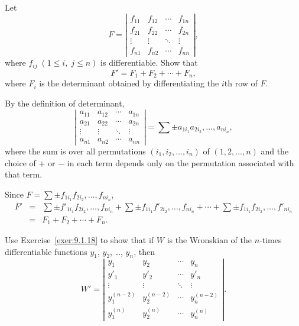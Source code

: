 \documentclass{ximera}
\begin{document}
\begin{problem}\label{exer:9.1.18}
Let
$$
F=\left|\begin{array}{cccc}
f_{11}&f_{12}&\cdots&f_{1n}\\ 
f_{21}&f_{22}&\cdots&f_{2n}\\ 
\vdots&\vdots&\ddots&\vdots\\ 
f_{n1}&f_{n2}&\cdots&f_{nn}\end{array}\right|,
$$
where $f_{ij}\; (1\le i,\;   j\le n)$ is differentiable.  Show that
$$
F'=F_1+F_2+\cdots+F_n,
$$
where $F_i$ is the determinant obtained by differentiating the
$i$th row of $F$.

\begin{hint}
By the definition of determinant,
$$
\left|\begin{array}{cccc}
a_{11}&a_{12}&\cdots&a_{1n}\\ 
a_{21}&a_{22}&\cdots&a_{2n}\\ 
\vdots&\vdots&\ddots&\vdots\\ 
a_{n1}&a_{n2}&\cdots&a_{nn}\end{array}\right|
=\sum\pm a_{1i_1}a_{2i_2},\dots,a_{ni_n},
$$
where the sum is over all permutations $(i_1,i_2,\dots,i_n)$ of
$(1,2,\dots, n)$ and the choice of $+$ or $-$ in each term depends
only on the permutation associated with that term.
\end{hint}

\begin{solution}
Since
$F=\sum\pm f_{1i_1}f_{2i_2},\dots,f_{ni_n}$,
\begin{eqnarray*}
F'&=&\sum\pm f'_{1i_1}f_{2i_2},\dots,f_{ni_n}
+\sum\pm f_{1i_1}f'_{2i_2},\dots,f_{ni_n}+\cdots+
\sum\pm f_{1i_1}f_{2i_2},\dots,f'_{ni_n}\\
&=&F_1+F_2+\cdots+F_n.
\end{eqnarray*}
\end{solution}
\end{problem}


\begin{problem}\label{exer:9.1.19}
Use Exercise~\ref{exer:9.1.18}  to show that if $W$ is the
Wronskian of the
$n$-times differentiable functions $y_1$, $y_2$, \dots, $y_n$, then
$$
W'=
\left|\begin{array}{cccc}
y_1&y_2&\cdots&y_n\\ 
y'_1&y'_2&\cdots&y'_n\\ 
\vdots&\vdots&\ddots&\vdots\\ 
y_1^{(n-2)}&y_2^{(n-2)}&\cdots&y_n^{(n-2)}\\ 
y_1^{(n)}&y_2^{(n)}&\cdots&y_n^{(n)}
\end{array}\right|.
$$
\end{problem}
\end{document}
